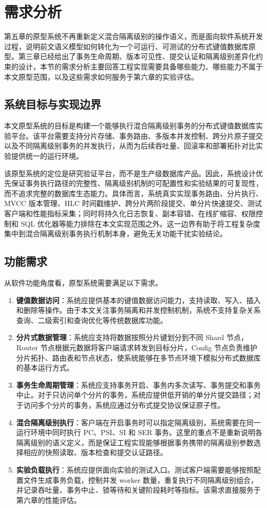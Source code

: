 \section{需求分析}
第五章的原型系统不再重新定义混合隔离级别的操作语义，而是面向软件系统开发过程，说明前文语义模型如何转化为一个可运行、可测试的分布式键值数据库原型。第三章已经给出了事务生命周期、版本可见性、提交认证和隔离级别差异化约束的设计，本节的需求分析主要回答工程实现需要具备哪些能力、哪些能力不属于本文原型范围，以及这些需求如何服务于第六章的实验评估。

\subsection{系统目标与实现边界}

本文原型系统的目标是构建一个能够执行混合隔离级别事务的分布式键值数据库实验平台。该平台需要支持分片存储、事务路由、多版本并发控制、跨分片原子提交以及不同隔离级别事务的并发执行，从而为后续吞吐量、回滚率和部署拓扑对比实验提供统一的运行环境。

该原型系统的定位是研究验证平台，而不是生产级数据库产品。因此，系统设计优先保证事务执行路径的完整性、隔离级别机制的可配置性和实验结果的可复现性，而不追求完整的数据库生态能力。具体而言，系统真实实现事务路由、分片执行、MVCC 版本管理、HLC 时间戳维护、跨分片两阶段提交、单分片快速提交、测试客户端和性能指标采集；同时将持久化日志恢复、副本容错、在线扩缩容、权限控制和 SQL 优化器等能力排除在本文实现范围之外。这一边界有助于将工程复杂度集中到混合隔离级别事务执行机制本身，避免无关功能干扰实验结论。

\subsection{功能需求}
从软件功能角度看，原型系统需要满足以下需求。

\begin{enumerate}
      \item \textbf{键值数据访问}：系统应提供基本的键值数据访问能力，支持读取、写入、插入和删除等操作。由于本文关注事务隔离和并发控制机制，系统不支持复杂关系查询、二级索引和查询优化等传统数据库功能。
      \item \textbf{分片式数据管理}：系统应支持将数据按照分片键划分到不同 Shard 节点，Router 节点根据元数据将客户端请求转发到目标分片，Config 节点负责维护分片拓扑、路由表和节点状态，使系统能够在多节点环境下模拟分布式数据库的基本运行方式。
      \item \textbf{事务生命周期管理}：系统应支持事务开启、事务内多次读写、事务提交和事务中止。对于只访问单个分片的事务，系统应提供低开销的单分片提交路径；对于访问多个分片的事务，系统应通过分布式提交协议保证原子性。
      \item \textbf{混合隔离级别执行}：客户端在开启事务时可以指定隔离级别，系统需要在同一运行环境中同时执行 PC、PSI、SI 和 SER 事务。这里的重点不是重新说明各隔离级别的语义定义，而是保证工程实现能够根据事务携带的隔离级别参数选择相应的快照读取、版本检查和提交认证路径。
      \item \textbf{实验负载执行}：系统应提供面向实验的测试入口。测试客户端需要能够按照配置文件生成事务负载，控制并发 worker 数量，重复执行不同隔离级别组合，并记录吞吐量、事务中止、锁等待和关键阶段耗时等指标。该需求直接服务于第六章的性能评估。
\end{enumerate}

